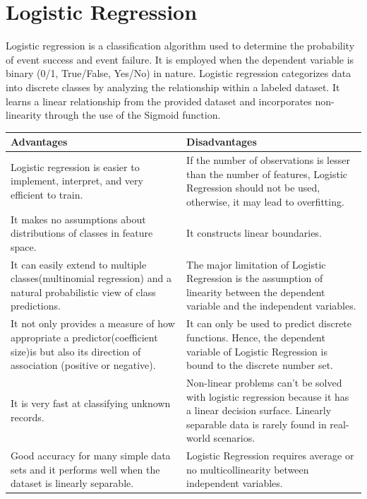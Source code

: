 \documentclass{template}
\begin{document}
\section{Logistic Regression}
Logistic regression is a classification algorithm used to determine the probability of event success and event failure. It is employed when the dependent variable is binary (0/1, True/False, Yes/No) in nature. Logistic regression categorizes data into discrete classes by analyzing the relationship within a labeled dataset. It learns a linear relationship from the provided dataset and incorporates non-linearity through the use of the Sigmoid function.\cite{LR}\\
\begin{table}[h]
  \begin{center}
    \begin{tabular}[t]{|p{6cm}|p{6cm}|}
    \hline
         \textbf{Advantages} & \textbf{Disadvantages}\\
    \hline  
         Logistic regression is easier to implement, interpret, and very efficient to train. & If the number of observations is lesser than the number of features, Logistic Regression should not be used, otherwise, it may lead to overfitting. \\
    \hline 
         It makes no assumptions about distributions of classes in feature space. & It constructs linear boundaries.  \\
    \hline 
         It can easily extend to multiple classes(multinomial regression) and a natural probabilistic view of class predictions. & The major limitation of Logistic Regression is the assumption of linearity between the dependent variable and the independent variables.  \\
         \hline 
         It not only provides a measure of how appropriate a predictor(coefficient size)is but also its direction of association (positive or negative). & It can only be used to predict discrete functions. Hence, the dependent variable of Logistic Regression is bound to the discrete number set.  \\
         \hline 
         It is very fast at classifying unknown records. & Non-linear problems can’t be solved with logistic regression because it has a linear decision surface. Linearly separable data is rarely found in real-world scenarios.  \\
         \hline 
         Good accuracy for many simple data sets and it performs well when the dataset is linearly separable. & Logistic Regression requires average or no multicollinearity between independent variables.  \\

\end{tabular}
\end{center}
\end{table}
\end{document}
